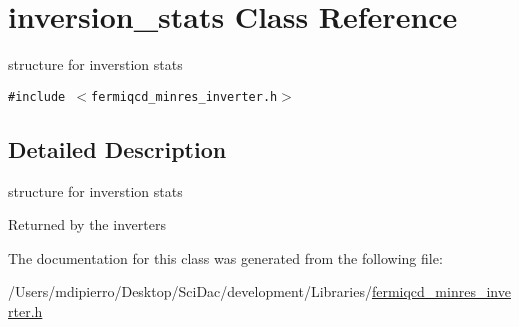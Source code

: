 \hypertarget{classinversion__stats}{
\section{inversion\_\-stats Class Reference}
\label{classinversion__stats}
}
structure for inverstion stats  


{\tt \#include $<$fermiqcd\_\-minres\_\-inverter.h$>$}



\subsection{Detailed Description}
structure for inverstion stats 

Returned by the inverters 

The documentation for this class was generated from the following file:\begin{CompactItemize}
\item 
/Users/mdipierro/Desktop/SciDac/development/Libraries/\hyperlink{fermiqcd__minres__inverter_8h}{fermiqcd\_\-minres\_\-inverter.h}\end{CompactItemize}
